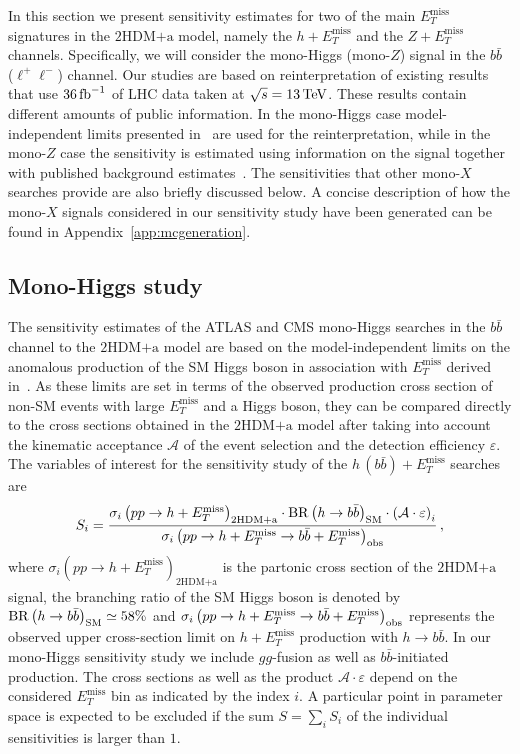 \documentclass[a4paper, 11pt,notoc]{article}
\newcommand{\MET}{\ensuremath{E_T^\mathrm{miss}}\xspace}
\newcommand{\met}{\MET}
\newcommand{\hdma}{\ensuremath{\textrm{2HDM+a}}\xspace}
\begin{document}
In this section we present sensitivity estimates for two of the main $\MET$ signatures in the \hdma model, namely the $h +\MET$  and the $Z+\MET$ channels. Specifically, we will consider the mono-Higgs (mono-$Z$) signal in the $b \bar b$ ($\ell^+ \ell^-$) channel.  Our studies are based on reinterpretation of existing results that use $36 \, {\rm fb}^{-1}$ of LHC data taken at $\sqrt{s} = 13 \, {\rm TeV}$. These results contain different amounts of public information. In the mono-Higgs case model-independent limits presented in~\cite{Aaboud:2017yqz} are used for the reinterpretation, while in the mono-$Z$ case  the sensitivity is estimated using information on the signal together with published background estimates~\cite{Aaboud:2017bja}.  The sensitivities that other mono-$X$ searches provide are also briefly discussed below.  A concise description of how the  mono-$X$ signals considered in our sensitivity study have been generated  can be found in Appendix~\ref{app:mcgeneration}.

\subsection{Mono-Higgs study}
\label{sec:sensi_monohbb}

The sensitivity estimates of the ATLAS and CMS mono-Higgs searches in the $b \bar b$ channel to the \hdma model are based on the model-independent limits on the anomalous production of the SM Higgs boson in association with \met derived in~\cite{Aaboud:2017yqz}.  As these limits are set in terms of the observed production cross section of non-SM events with large $\MET$ and a Higgs boson, they can be compared directly to the cross sections obtained in the \hdma model after taking into account the kinematic acceptance $\mathcal{A}$ of the event selection and the detection efficiency $\varepsilon$. The variables of interest for the sensitivity study of the $h \, (b \bar b) + \MET$ searches are
\begin{equation}
\label{eq:monoHbb_sensi}
S_i = \frac{\sigma_{i} \left ( p p \to h + \MET \right)_{\hdma} \cdot {\rm BR} \left (h \to b \bar b \right )_{\rm SM} \cdot \left ( \mathcal{A} \cdot \varepsilon \right)_i}
{\sigma_{i} \left ( p p \to h + \MET \to b \bar b + \MET \right)_{\rm obs}}\,,
\end{equation}
where $\sigma_{i} \left ( p p \to h + \MET \right)_{\hdma}$ is the partonic cross section of the \hdma signal,  the branching ratio of the SM Higgs boson is denoted by ${\rm BR} \left (h \to b \bar b \right )_{\rm SM} \simeq 58\%$  and $\sigma_{i} \left ( p p \to h + \MET \to b \bar b + \MET \right)_{\rm obs}$ represents the  observed upper cross-section limit on $h + \MET$ production with $h \to b \bar b$. In our mono-Higgs sensitivity study we include $gg$-fusion as well as $b \bar b$-initiated production.  The cross sections as well as the product $ \mathcal{A} \cdot \varepsilon$ depend on the considered $\MET$ bin as indicated by the index $i$.   A particular point in parameter space is expected to be excluded if the sum $S = \sum_i S_i$ of the individual sensitivities is larger than $1$.
\end{document}
